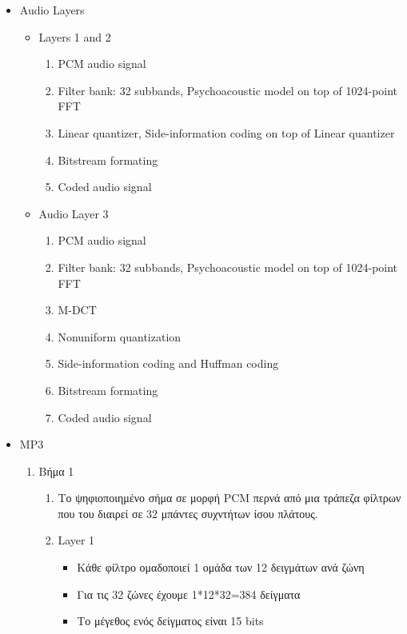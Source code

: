 \documentclass[a4paper,12pt]{article}
\begin{document}
\begin{itemize}
\begin{itemize}
\begin{enumerate}
        \end{enumerate}
    \end{itemize}
    \item Audio Layers
    \begin{itemize}
        \item Layers 1 and 2
        \begin{enumerate}
            \item PCM audio signal
            \item Filter bank: 32 subbands, Psychoacoustic model on top of 1024-point FFT
            \item Linear quantizer, Side-information coding on top of Linear quantizer
            \item Bitstream formating
            \item Coded audio signal
        \end{enumerate}
        \item Audio Layer 3
        \begin{enumerate}
            \item PCM audio signal
            \item Filter bank: 32 subbands, Psychoacoustic model on top of 1024-point FFT
            \item M-DCT
            \item Nonuniform quantization
            \item Side-information coding and Huffman coding
            \item Bitstream formating
            \item Coded audio signal
        \end{enumerate}
    \end{itemize}
    \item MP3
    \begin{enumerate}
        \item Βήμα 1
        \begin{enumerate}
            \item Το ψηφιοποιημένο σήμα σε μορφή PCM περνά από μια τράπεζα φίλτρων που του
            διαιρεί σε 32 μπάντες συχντήτων ίσου πλάτους.
            \item Layer 1
            \begin{itemize}
                \item Κάθε φίλτρο ομαδοποιεί 1 ομάδα των 12 δειγμάτων ανά ζώνη
                \item Για τις 32 ζώνες έχουμε 1*12*32=384 δείγματα
                \item Το μέγεθος ενός δείγματος είναι 15 bits

\end{itemize}
\end{enumerate}
\end{enumerate}
\end{itemize}
\end{document}
